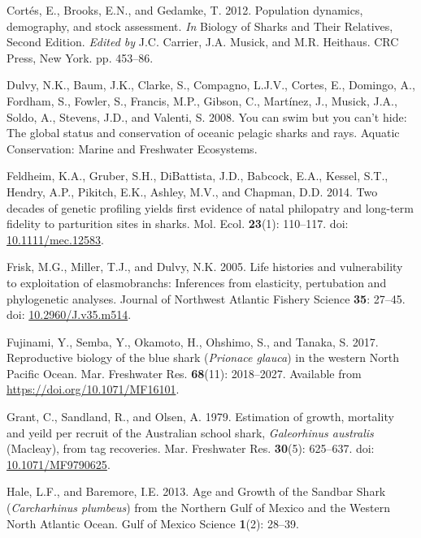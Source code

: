 \documentclass[
]{article}
\newenvironment{CSLReferences}%
  {}%
  {\par}
\begin{document}
\begin{CSLReferences}{1}{0}
Cortés, E., Brooks, E.N., and Gedamke, T. 2012. Population dynamics, demography, and stock assessment. \emph{In} Biology of {Sharks} and {Their} {Relatives}, {Second} {Edition}. \emph{Edited by} J.C. Carrier, J.A. Musick, and M.R. Heithaus. CRC Press, New York. pp. 453--86.

Dulvy, N.K., Baum, J.K., Clarke, S., Compagno, L.J.V., Cortes, E., Domingo, A., Fordham, S., Fowler, S., Francis, M.P., Gibson, C., Martínez, J., Musick, J.A., Soldo, A., Stevens, J.D., and Valenti, S. 2008. You can swim but you can't hide: The global status and conservation of oceanic pelagic sharks and rays. Aquatic Conservation: Marine and Freshwater Ecosystems.

Feldheim, K.A., Gruber, S.H., DiBattista, J.D., Babcock, E.A., Kessel, S.T., Hendry, A.P., Pikitch, E.K., Ashley, M.V., and Chapman, D.D. 2014. Two decades of genetic profiling yields first evidence of natal philopatry and long-term fidelity to parturition sites in sharks. Mol. Ecol. \textbf{23}(1): 110--117. doi: \href{https://doi.org/10.1111/mec.12583}{10.1111/mec.12583}.

Frisk, M.G., Miller, T.J., and Dulvy, N.K. 2005. Life histories and vulnerability to exploitation of elasmobranchs: {Inferences} from elasticity, pertubation and phylogenetic analyses. Journal of Northwest Atlantic Fishery Science \textbf{35}: 27--45. doi: \href{https://doi.org/10.2960/J.v35.m514}{10.2960/J.v35.m514}.

Fujinami, Y., Semba, Y., Okamoto, H., Ohshimo, S., and Tanaka, S. 2017. Reproductive biology of the blue shark (\emph{{Prionace} glauca}) in the western {North} {Pacific} {Ocean}. Mar. Freshwater Res. \textbf{68}(11): 2018--2027. Available from \url{https://doi.org/10.1071/MF16101}.

Grant, C., Sandland, R., and Olsen, A. 1979. Estimation of growth, mortality and yeild per recruit of the {Australian} school shark, \emph{{Galeorhinus} australis} ({Macleay}), from tag recoveries. Mar. Freshwater Res. \textbf{30}(5): 625--637. doi: \href{https://doi.org/10.1071/MF9790625}{10.1071/MF9790625}.

Hale, L.F., and Baremore, I.E. 2013. Age and {Growth} of the {Sandbar} {Shark} (\emph{{Carcharhinus} plumbeus}) from the {Northern} {Gulf} of {Mexico} and the {Western} {North} {Atlantic} {Ocean}. Gulf of Mexico Science \textbf{1}(2): 28--39.


\end{CSLReferences}
\end{document}
